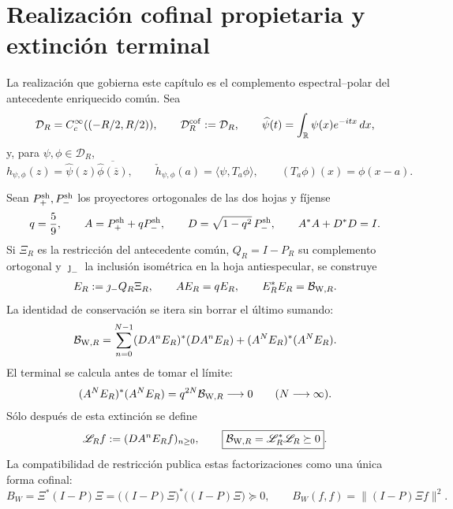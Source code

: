 \section*{Realización cofinal propietaria y extinción terminal}

La realización que gobierna este capítulo es el complemento espectral--polar
del antecedente enriquecido común. Sea
\[
 \mathcal D_R=C_c^\infty((-R/2,R/2)),\qquad
 \mathcal D_R^{\rm cof}:=\mathcal D_R,\qquad
 \widehat\psi(t)=\int_{\mathbb R}\psi(x)e^{-itx}\,dx ,
\]
y, para \(\psi,\phi\in\mathcal D_R\),
\[
 h_{\psi,\phi}(z)
 =\widehat\psi(z)\overline{\widehat\phi(\overline z)},\qquad
 \check h_{\psi,\phi}(a)
 =\langle\psi,T_a\phi\rangle ,
 \qquad (T_a\phi)(x)=\phi(x-a).
\]

Sean \(P_+^{\rm sh},P_-^{\rm sh}\) los proyectores ortogonales de las dos
hojas y fíjense
\begin{equation}\label{eq:amp-rh-owner-q}
 q=\frac59,\qquad
 A=P_+^{\rm sh}+qP_-^{\rm sh},\qquad
 D=\sqrt{1-q^2}\,P_-^{\rm sh},\qquad A^*A+D^*D=I.
\end{equation}
Si \(\Xi_R\) es la restricción del antecedente común, \(Q_R=I-P_R\) su
complemento ortogonal y \(\jmath_-\) la inclusión isométrica en la hoja
antiespecular, se construye
\begin{equation}\label{eq:amp-rh-owner-binding}
 E_R:=\jmath_-Q_R\Xi_R,\qquad
 AE_R=qE_R,\qquad
 E_R^*E_R=\mathcal B_{{\rm W},R}.
\end{equation}
La identidad de conservación se itera sin borrar el último sumando:
\begin{equation}\label{eq:amp-rh-owner-telescopia}
 \mathcal B_{{\rm W},R}
 =\sum_{n=0}^{N-1}(DA^nE_R)^*(DA^nE_R)
 +(A^NE_R)^*(A^NE_R).
\end{equation}
El terminal se calcula antes de tomar el límite:
\begin{equation}\label{eq:amp-rh-owner-terminal}
 (A^NE_R)^*(A^NE_R)
 =q^{2N}\mathcal B_{{\rm W},R}\longrightarrow0
 \qquad(N\longrightarrow\infty).
\end{equation}
Sólo después de esta extinción se define
\begin{equation}\label{eq:amp-rh-owner-l}
 \mathscr L_Rf:=(DA^nE_Rf)_{n\geq0},
 \qquad
 \boxed{\mathcal B_{{\rm W},R}=\mathscr L_R^*\mathscr L_R\succeq0}.
\end{equation}
La compatibilidad de restricción publica estas factorizaciones como una
única forma cofinal:
\begin{equation}\label{eq:amp-rh-owner-publicacion}
 B_W=\Xi^*(I-P)\Xi
 =\bigl((I-P)\Xi\bigr)^*\bigl((I-P)\Xi\bigr)\succeq0,
 \qquad
 B_W(f,f)=\|(I-P)\Xi f\|^2.
\end{equation}

